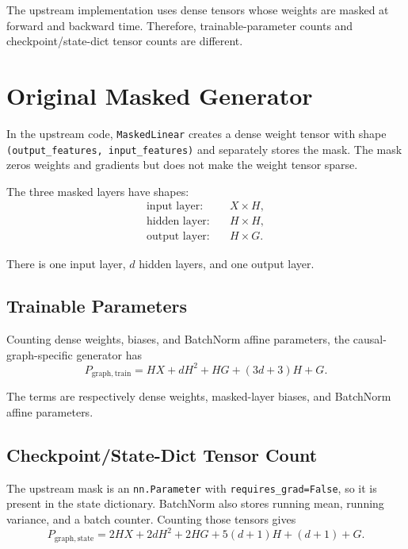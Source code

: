 \documentclass[11pt]{article}
\begin{document}
The upstream implementation uses dense tensors whose weights are masked at forward and backward
time. Therefore, trainable-parameter counts and checkpoint/state-dict tensor counts are different.

\section{Original Masked Generator}

In the upstream code, \texttt{MaskedLinear} creates a dense weight tensor with shape
\texttt{(output\_features, input\_features)} and separately stores the mask. The mask zeros
weights and gradients but does not make the weight tensor sparse.

The three masked layers have shapes:
\begin{align}
\text{input layer:} &\quad X \times H,\\
\text{hidden layer:} &\quad H \times H,\\
\text{output layer:} &\quad H \times G.
\end{align}

There is one input layer, $d$ hidden layers, and one output layer.

\subsection{Trainable Parameters}

Counting dense weights, biases, and BatchNorm affine parameters, the causal-graph-specific
generator has
\begin{equation}
\boxed{
P_{\mathrm{graph,train}}
=HX+dH^2+HG+(3d+3)H+G.
}
\end{equation}

The terms are respectively dense weights, masked-layer biases, and BatchNorm affine parameters.

\subsection{Checkpoint/State-Dict Tensor Count}

The upstream mask is an \texttt{nn.Parameter} with \texttt{requires\_grad=False}, so it is present
in the state dictionary. BatchNorm also stores running mean, running variance, and a batch counter.
Counting those tensors gives
\begin{equation}
\boxed{
P_{\mathrm{graph,state}}
=2HX+2dH^2+2HG+5(d+1)H+(d+1)+G.
}
\end{equation}
\end{document}
